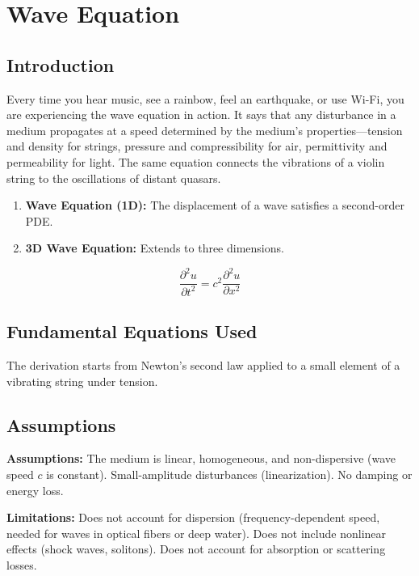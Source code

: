 \chapter{Wave Equation}

\section*{Introduction}

Every time you hear music, see a rainbow, feel an earthquake, or use Wi-Fi, you are experiencing the wave equation in action. It says that any disturbance in a medium propagates at a speed determined by the medium's properties---tension and density for strings, pressure and compressibility for air, permittivity and permeability for light. The same equation connects the vibrations of a violin string to the oscillations of distant quasars.

\begin{enumerate}
\item \textbf{Wave Equation (1D):} The displacement of a wave satisfies a second-order PDE.

\item \textbf{3D Wave Equation:} Extends to three dimensions.

\end{enumerate}


\[
\frac{\partial^2 u}{\partial t^2} = c^2 \frac{\partial^2 u}{\partial x^2}
\]

\section*{Fundamental Equations Used}

The derivation starts from Newton's second law applied to a small element of a vibrating string under tension.

\section*{Assumptions}

\textbf{Assumptions:} The medium is linear, homogeneous, and non-dispersive (wave speed $c$ is constant). Small-amplitude disturbances (linearization). No damping or energy loss.


\textbf{Limitations:} Does not account for dispersion (frequency-dependent speed, needed for waves in optical fibers or deep water). Does not include nonlinear effects (shock waves, solitons). Does not account for absorption or scattering losses.


